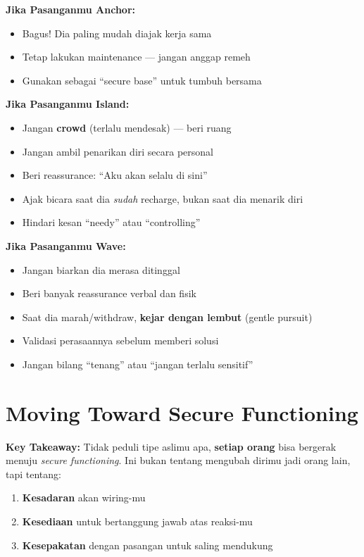 \begin{praktikbox}
\textbf{Jika Pasanganmu Anchor:}
\begin{itemize}
    \item Bagus! Dia paling mudah diajak kerja sama
    \item Tetap lakukan maintenance --- jangan anggap remeh
    \item Gunakan sebagai ``secure base'' untuk tumbuh bersama
\end{itemize}

\textbf{Jika Pasanganmu Island:}
\begin{itemize}
    \item Jangan \textbf{crowd} (terlalu mendesak) --- beri ruang
    \item Jangan ambil penarikan diri secara personal
    \item Beri reassurance: ``Aku akan selalu di sini''
    \item Ajak bicara saat dia \textit{sudah} recharge, bukan saat dia menarik diri
    \item Hindari kesan ``needy'' atau ``controlling''
\end{itemize}

\textbf{Jika Pasanganmu Wave:}
\begin{itemize}
    \item Jangan biarkan dia merasa ditinggal
    \item Beri banyak reassurance verbal dan fisik
    \item Saat dia marah/withdraw, \textbf{kejar dengan lembut} (gentle pursuit)
    \item Validasi perasaannya sebelum memberi solusi
    \item Jangan bilang ``tenang'' atau ``jangan terlalu sensitif''
\end{itemize}
\end{praktikbox}

\section{Moving Toward Secure Functioning}

\begin{insightbox}
\textbf{Key Takeaway:} Tidak peduli tipe aslimu apa, \textbf{setiap orang} bisa bergerak menuju \textit{secure functioning}. Ini bukan tentang mengubah dirimu jadi orang lain, tapi tentang:
\begin{enumerate}
    \item \textbf{Kesadaran} akan wiring-mu
    \item \textbf{Kesediaan} untuk bertanggung jawab atas reaksi-mu
    \item \textbf{Kesepakatan} dengan pasangan untuk saling mendukung
\end{enumerate}
\end{insightbox}

